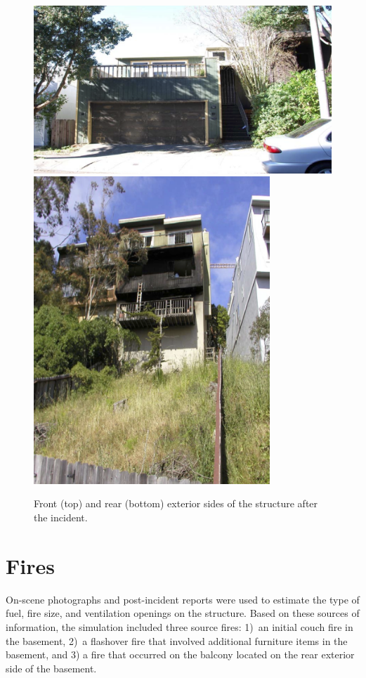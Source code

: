 \documentclass[12pt,oneside]{book}
\begin{document}
\begin{figure}[!ht]
\includegraphics[width=5.50in]{../Figures/Post_Exterior_Front} \\
\vspace{0.1in}
\includegraphics[width=3.50in]{../Figures/Post_Exterior_Rear}
\caption[Front and rear exterior of the structure after the incident.]
{Front (top) and rear (bottom) exterior sides of the structure after the incident.}
\label{fig:post_exterior}
\end{figure}

\section{Fires}
\label{sec:fires}

On-scene photographs and post-incident reports were used to estimate the type of fuel, fire size, and ventilation openings on the structure. Based on these sources of information, the simulation included three source fires: 1)~an initial couch fire in the basement, 2)~a flashover fire that involved additional furniture items in the basement, and 3) a fire that occurred on the balcony located on the rear exterior side of the basement.
\end{document}
